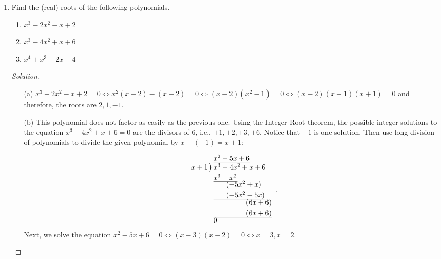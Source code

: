 \documentclass[12pt]{article}
\newenvironment{solution}{\begin{proof}[Solution]}{\end{proof}}
\begin{document}
\begin{enumerate}
\begin{enumerate}
		
		\end{enumerate}
		
		\begin{solution}
			\begin{itemize}
				\item[(a)] 	Two polynomials are equal if the corresponding coefficients are equal. We have
				$f(x)=2x^2-12x+18-4x-4=2x^2-16x+14$, so we get 
				$a-1=2, b+5=-16, c=14$, i.e. $a=3,b=-21,c=14$.
				\item[(b)] We have $f(x)=2x^3-4x^2+5x-6x^2+12x-15+x^3-3x^2+x+2x^2-6x+2=3x^3-11x^2+12x-13$. Thus $a+b=3,2a-c=-11,b+3c=12$, i.e., $a=-\dfrac{24}{5},b=\dfrac{39}{5},c=\dfrac{7}{5}$.
			\end{itemize}
		\end{solution}
		
		\item Find the (real) roots of the following polynomials.
		\begin{enumerate}
			\item $x^3-2x^2-x+2$
			
			\item $x^3-4x^2+x+6$
			
			\item $x^4+x^3+2x-4$
		
		\end{enumerate}
		
		\begin{solution}
			\begin{itemize}
				\item[(a)] 	$x^3-2x^2-x+2=0 \iff x^2(x-2)-(x-2)=0\iff (x-2)(x^2-1)=0\iff (x-2)(x-1)(x+1)=0$ and therefore, the roots are $2,1,-1$.
				\item[(b)] 	This polynomial does not factor as easily as the previous one. Using the Integer Root theorem, the possible integer solutions to the equation $x^3-4x^2+x+6=0$ are the divisors of $6$, i.e., $\pm1,\pm2,\pm3,\pm6$. Notice that $-1$ is one solution. Then use long division of polynomials to divide the given polynomial by $x-(-1)=x+1$:
				
				$$
				\begin{array}{r@{}l}
					& \underline{x^2-5x+6} \\
					x+1\,\big)\,& x^3-4x^2+x+6 \\[1mm]
					& \underline{x^3+x^2} \\[-1mm]
					& \phantom{x^3+}(-5x^2+x) \\[1mm]
					& \underline{\phantom{x^3+}(-5x^2-5x)} \\[-1mm]
					& \phantom{x^3-4x^2+}(6x+6) \\[1mm]
					& \underline{\phantom{x^3-4x^2+}(6x+6)} \\[-1mm]
					& 0
				\end{array}.
				$$
				Next, we solve the equation $x^2-5x+6=0\iff(x-3)(x-2)=0\iff x=3,x=2$.
				

\end{itemize}
\end{solution}
\end{enumerate}
\end{document}
